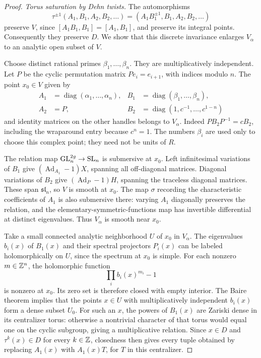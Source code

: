 \begin{proof}
\smallskip\noindent\emph{Torus saturation by Dehn twists.}
The automorphisms
\[
 \tau^{\pm1}(A_1,B_1,A_2,B_2,\ldots)
       =(A_1B_1^{\pm1},B_1,A_2,B_2,\ldots)
\]
preserve $V$, since $[A_1B_1,B_1]=[A_1,B_1]$, and preserve its integral
points.  Consequently they preserve $D$.  We show that this discrete
invariance enlarges $V_\alpha$ to an analytic open subset of $V$.

Choose distinct rational primes $\beta_1,\ldots,\beta_n$.  They are
multiplicatively independent.  Let $P$ be the cyclic permutation
matrix $Pe_i=e_{i+1}$, with indices modulo $n$.  The point $x_0\in V$
given by
\begin{equation}\label{eq:twist-test-point}
 \begin{aligned}
 A_1&=\operatorname{diag}(\alpha_1,\ldots,\alpha_n),&
 B_1&=\operatorname{diag}(\beta_1,\ldots,\beta_n),\\
 A_2&=P,&
 B_2&=\operatorname{diag}(1,c^{-1},\ldots,c^{1-n})
 \end{aligned}
\end{equation}
and identity matrices on the other handles belongs to $V_\alpha$.
Indeed $PB_2P^{-1}=cB_2$, including the wraparound entry because
$c^n=1$.  The numbers $\beta_i$ are used only to choose this complex
point; they need not be units of $R$.

The relation map $\operatorname{GL}_n^{2g}\to\operatorname{SL}_n$ is submersive at $x_0$.
Left infinitesimal variations of $B_1$ give
$(\operatorname{Ad}_{A_1}-1)X$, spanning all off-diagonal matrices.
Diagonal variations of $B_2$ give
$(\operatorname{Ad}_P-1)H$, spanning the traceless diagonal matrices.
These span $\mathfrak{sl}_n$, so $V$ is smooth at $x_0$.
The map $\sigma$ recording the characteristic coefficients of $A_1$
is also submersive there: varying $A_1$ diagonally preserves the
relation, and the elementary-symmetric-functions map has invertible
differential at distinct eigenvalues.  Thus $V_\alpha$ is smooth near
$x_0$.

Take a small connected analytic neighborhood $U$ of $x_0$ in
$V_\alpha$.  The eigenvalues $b_i(x)$ of $B_1(x)$ and their spectral
projectors $P_i(x)$ can be labeled holomorphically on $U$, since the
spectrum at $x_0$ is simple.  For each nonzero $m\in\mathbb Z^n$, the
holomorphic function
\[
             \prod_i b_i(x)^{m_i}-1
\]
is nonzero at $x_0$.  Its zero set is therefore closed with empty
interior.  The Baire theorem implies that the points $x\in U$ with
multiplicatively independent $b_i(x)$ form a dense subset $U_0$.
For such an $x$, the powers of $B_1(x)$ are Zariski dense in its
centralizer torus: otherwise a nontrivial character of that torus
would equal one on the cyclic subgroup, giving a multiplicative relation.
Since $x\in D$ and $\tau^k(x)\in D$ for every $k\in\mathbb Z$, closedness
then gives every tuple obtained by replacing $A_1(x)$ with $A_1(x)T$,
for $T$ in this centralizer.


\end{proof}
